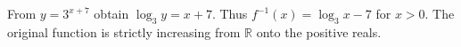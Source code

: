 From $y=3^{x+7}$ obtain $\log_3y=x+7$. Thus $\boxed{f^{-1}(x)=\log_3x-7}$ for $x>0$. The original function is strictly increasing from $\mathbb R$ onto the positive reals.
